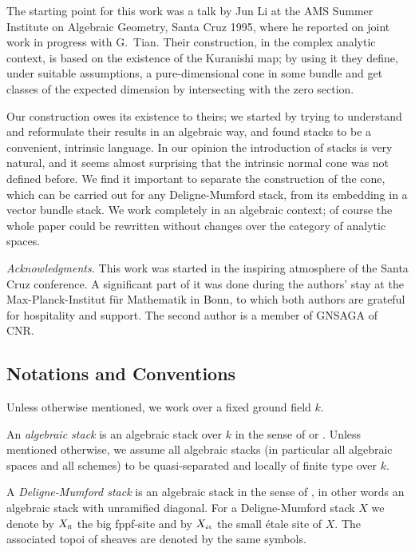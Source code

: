 \documentclass[11pt]{article}
\theoremstyle{plain}
\theoremstyle{definition}
\newcommand{\et}{{\mbox{\tiny \'{e}t}}}
\newcommand{\fl}{{\mbox{\tiny fl}}}
\theoremstyle{plain}
\theoremstyle{definition}
\theoremstyle{remark}
\begin{document}
The starting point for this work was a talk by Jun Li at the AMS
Summer Institute on Algebraic Geometry, Santa Cruz 1995, where he
reported on joint work in progress with G.~Tian. Their construction,
in the complex analytic context, is based on the existence of the
Kuranishi map; by using it they define, under suitable assumptions, a
pure-dimensional cone in some bundle and get classes of the expected
dimension by intersecting with the zero section.

Our construction owes its existence to theirs; we started by trying to
understand and reformulate their results in an algebraic way, and
found stacks to be a convenient, intrinsic language. In our opinion
the introduction of stacks is very natural, and it seems almost
surprising that the intrinsic normal cone was not defined before. We
find it important to separate the construction of the cone, which can
be carried out for any Deligne-Mumford stack, from its embedding in a
vector bundle stack. We work completely in an algebraic context; of
course the whole paper could be rewritten without changes over the
category of analytic spaces.

\smallskip\noindent
{\em Acknowledgments. }This work was started in the inspiring
atmosphere of the Santa Cruz conference. A significant part of it was done
during
the authors' stay at the Max-Planck-Institut f\"ur Mathematik in Bonn, to which
both authors are grateful for hospitality and support. The second author is a
member of GNSAGA of CNR.

\subsection{Notations and Conventions}

Unless otherwise mentioned, we work over a fixed ground field \(k\).

An {\em algebraic stack }is an algebraic stack over \(k\) in the sense
of \cite{vdas} or \cite{laumon}. Unless mentioned otherwise, we assume
all algebraic stacks (in particular all algebraic spaces and all
schemes) to be quasi-separated and locally of finite type over \(k\).

A {\em Deligne-Mumford stack }is an algebraic stack in the sense of
\cite{DM}, in other words an algebraic stack with unramified
diagonal. For a Deligne-Mumford stack \(X\) we denote by \(X_\fl\) the big
fppf-site and by \(X_\et\) the small \'etale site of \(X\). The associated
topoi of sheaves are denoted by the same symbols.
\end{document}
